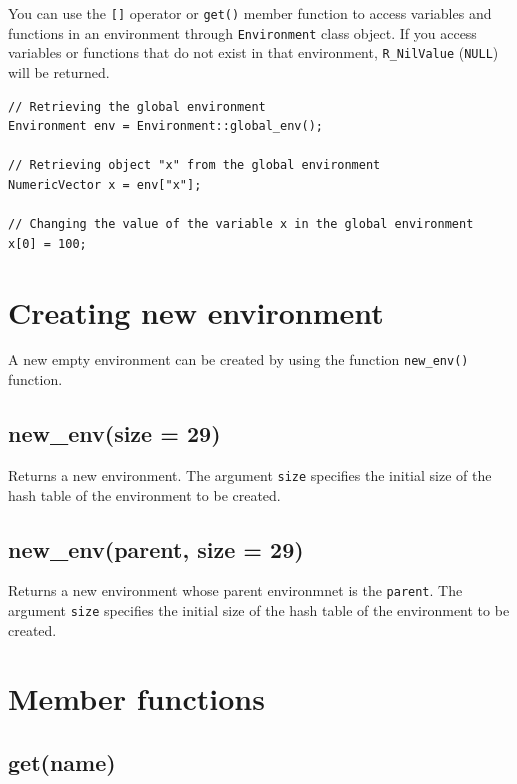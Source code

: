 \documentclass[
]{book}
\begin{document}
You can use the \texttt{{[}{]}} operator or \texttt{get()} member function to access variables and functions in an environment through \texttt{Environment} class object. If you access variables or functions that do not exist in that environment, \texttt{R\_NilValue} (\texttt{NULL}) will be returned.

\begin{verbatim}
// Retrieving the global environment
Environment env = Environment::global_env();

// Retrieving object "x" from the global environment
NumericVector x = env["x"];

// Changing the value of the variable x in the global environment
x[0] = 100;
\end{verbatim}

\hypertarget{creating-new-environment}{%
\section{Creating new environment}\label{creating-new-environment}}

A new empty environment can be created by using the function \texttt{new\_env()} function.

\hypertarget{new_envsize-29}{%
\subsection{new\_env(size = 29)}\label{new_envsize-29}}

Returns a new environment. The argument \texttt{size} specifies the initial size of the hash table of the environment to be created.

\hypertarget{new_envparent-size-29}{%
\subsection{new\_env(parent, size = 29)}\label{new_envparent-size-29}}

Returns a new environment whose parent environmnet is the \texttt{parent}. The argument \texttt{size} specifies the initial size of the hash table of the environment to be created.

\hypertarget{member-functions}{%
\section{Member functions}\label{member-functions}}

\hypertarget{getname}{%
\subsection{get(name)}\label{getname}}
\end{document}
